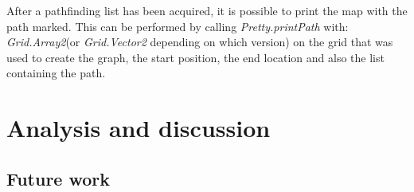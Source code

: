 \documentclass[12pt, a4paper]{article}
\begin{document}
After a pathfinding list has been acquired, it is possible to print the map with the path marked. This can be performed by
calling \textit{Pretty.printPath} with: \textit{Grid.Array2}(or \textit{Grid.Vector2} depending on which version)
on the grid that was used to create the graph, the start position, the end location and also the list containing the path.


\section{Analysis and discussion}
\label{Analysis}





\subsection{Future work}








\pagebreak


\end{document}
